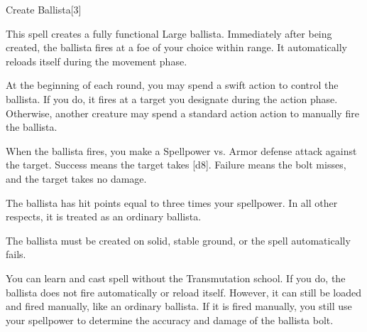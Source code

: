 \begin{spellsection}{Create Ballista}[3]
    \begin{spellheader}
    \end{spellheader}
    \begin{spellcontent}
        \begin{spelltargetinginfo}
        \end{spelltargetinginfo}
        \begin{spelleffects}
            \spelleffect This spell creates a fully functional Large ballista.
            Immediately after being created, the ballista fires at a foe of your choice within \rnglong range.
            It automatically reloads itself during the movement phase.

            At the beginning of each round, you may spend a swift action to control the ballista.
            If you do, it fires at a target you designate during the action phase.
            Otherwise, another creature may spend a standard action action to manually fire the ballista.

            When the ballista fires, you make a Spellpower vs. Armor defense attack against the target.
            Success means the target takes [d8].
            Failure means the bolt misses, and the target takes no damage.

            The ballista has hit points equal to three times your spellpower.
            In all other respects, it is treated as an ordinary ballista.
            \spelldur \durshort
        \end{spelleffects}
    \end{spellcontent}
    \begin{spellfooter}
        \spellnotes The ballista must be created on solid, stable ground, or the spell automatically fails.

        You can learn and cast spell without the Transmutation school.
        If you do, the ballista does not fire automatically or reload itself.
        However, it can still be loaded and fired manually, like an ordinary ballista.
        If it is fired manually, you still use your spellpower to determine the accuracy and damage of the ballista bolt.
        \miscastexplode
    \end{spellfooter}
\end{spellsection}

